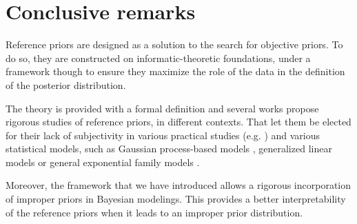 \section{Conclusive remarks}\label{sec:intro-ref:conclusion}



Reference priors are designed 
as a solution to the search for objective priors.
To do so, they are constructed on informatic-theoretic foundations, under a framework though to ensure they maximize the role of the data in the definition of the posterior distribution.


The theory is provided with a formal definition and
several works propose rigorous studies of reference priors, in different contexts.
That let them be elected for their lack of subjectivity in various practical studies (e.g. \cite{chen_properties_2008,gu_parallel_2016,dandrea_objective_2021})
and various statistical models, such as Gaussian process-based models \citep{paulo_default_2005,gu_parallel_2016}, generalized linear models \citep{natarajan_reference_2000} or general exponential family models \citep{clarke_reference_2010}.

Moreover, the framework that we have introduced allows a rigorous incorporation of improper priors in Bayesian modelings.
This provides a better interpretability of the reference priors when it leads to an improper prior distribution. 









